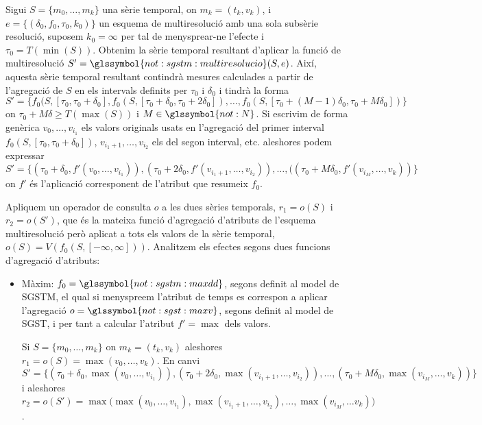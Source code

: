 \begin{example}
  \label{ex:multiresolucio:f=op}
  Sigui $S=\{m_0,\dotsc,m_k\}$ una sèrie temporal, on $m_k=(t_k,v_k)$,
  i $e= \{ (\delta_0, f_0, \tau_0, k_0) \}$ un esquema de
  multiresolució amb una sola subsèrie resolució, suposem $k_0=\infty$
  per tal de menysprear-ne l'efecte i $\tau_0=T(\min(S))$. Obtenim la
  sèrie temporal resultant d'aplicar la funció de multiresolució
  $S'=\glssymbol{not:sgstm:multiresolucio}(S,e)$.  Així, aquesta sèrie
  temporal resultant contindrà mesures calculades a partir de
  l'agregació de $S$ en els intervals definits per $\tau_0$ i
  $\delta_0$ i tindrà la forma $S'=\{ f_0(S,[\tau_0,\tau_0+\delta_0],
  f_0(S,[\tau_0+\delta_0,\tau_0+2\delta_0]),\dotsc,
  f_0(S,[\tau_0+(M-1)\delta_0,\tau_0+M\delta_0])\}$ on
  $\tau_0+M\delta\geq T(\max(S))$ i $M\in\glssymbol{not:N}$. Si
  escrivim de forma genèrica $v_0,\dotsc,v_{i_1}$ els valors originals
  usats en l'agregació del primer interval
  $f_0(S,[\tau_0,\tau_0+\delta_0])$, $v_{i_1+1},\dotsc,v_{i_2}$ els del
  segon interval, etc. aleshores podem expressar $S'=\{
  (\tau_0+\delta_0, f'(v_0,\dotsc,v_{i_1})), (\tau_0+2\delta_0,
  f'(v_{i_1+1},\dotsc,v_{i_2})), \dotsc, ((\tau_0+M\delta_0 ,f'(v_{i_M},
  \dotsc, v_k)) \}$ on $f'$ és l'aplicació corresponent de l'atribut
  que resumeix $f_0$.

  Apliquem un operador de consulta $o$ a les dues sèries temporals,
  $r_1=o(S)$ i $r_2=o(S')$, que és la mateixa funció d'agregació
  d'atributs de l'esquema multiresolució però aplicat a tots els
  valors de la sèrie temporal,
  $o(S)=V(f_0(S,[-\infty,\infty]))$. Analitzem els efectes segons dues
  funcions d'agregació d'atributs:

  \begin{itemize}
  \item Màxim: $f_0=\glssymbol{not:sgstm:maxdd}$, segons definit al
    model de \gls{SGSTM}, el qual si menyspreem l'atribut de temps es
    correspon a aplicar l'agregació $o=\glssymbol{not:sgst:maxv}$,
    segons definit al model de \gls{SGST}, i per tant a calcular
    l'atribut $f'=\max$ dels valors.

    Si $S=\{m_0,\dotsc,m_k\}$ on $m_k=(t_k,v_k)$ aleshores
    $r_1=o(S)=\max(v_0,\dotsc, v_k)$. En canvi $S'=\{
    (\tau_0+\delta_0, \max(v_0,\dotsc,v_{i_1})),
    (\tau_0+2\delta_0,\max(v_{i_1+1},\dotsc,v_{i_2})), \dotsc,
    (\tau_0+M\delta_0,\max(v_{i_M}, \dotsc, v_k)) \}$ i aleshores
    $r_2=o(S')= \max\big( \max(v_0,\dotsc,v_{i_1}),
    \max(v_{i_1+1},\dotsc,v_{i_2}), \dotsc, \max(v_{i_M}, \dotsc v_k)
    \big)$.


\end{itemize}
\end{example}

